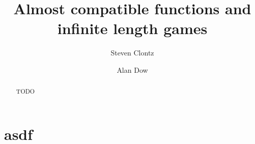 \documentclass{amsart}
\theoremstyle{definition}
\begin{document}
\title{Almost compatible functions and infinite length games}




\author{Steven Clontz}
\address{Department of Mathematics and Statistics, UNC Charlotte,
Charlotte, NC 28262}
\author{Alan Dow}
\address{Department of Mathematics and Statistics, UNC Charlotte,
Charlotte, NC 28262}


\subjclass[2010]{}


\begin{abstract}
  TODO
\end{abstract}


\maketitle

\section{asdf}



\end{document}
